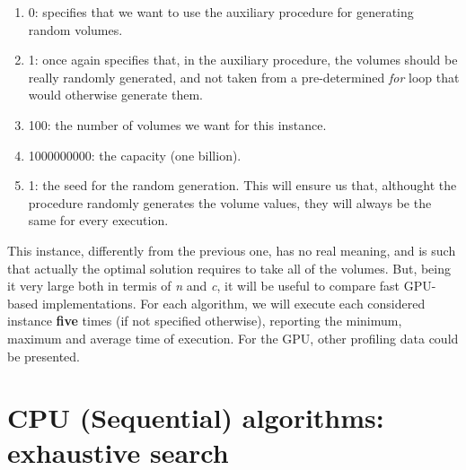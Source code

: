 \documentclass[12pt]{extarticle}
\begin{document}
\begin{enumerate}
    \item 0: specifies that we want to use the auxiliary procedure for generating random volumes.
    \item 1: once again specifies that, in the auxiliary procedure, the volumes should be really randomly generated, and not taken from a pre-determined \emph{for} loop that would otherwise generate them.
    \item 100: the number of volumes we want for this instance.
    \item 1000000000: the capacity (one billion).
    \item 1: the seed for the random generation. This will ensure us that, althought the procedure randomly generates the volume values, they will always be the same for every execution.
\end{enumerate}
This instance, differently from the previous one, has no real meaning, and is such that actually the optimal solution requires to take all of the volumes. But, being it very large both in termis of \emph{n} and \emph{c}, it will be useful to compare fast GPU-based implementations.\newline
\newline
For each algorithm, we will execute each considered instance \textbf{five} times (if not specified otherwise), reporting the minimum, maximum and average time of execution. For the GPU, other profiling data could be presented.
\section{CPU (Sequential) algorithms: exhaustive search}
\end{document}
